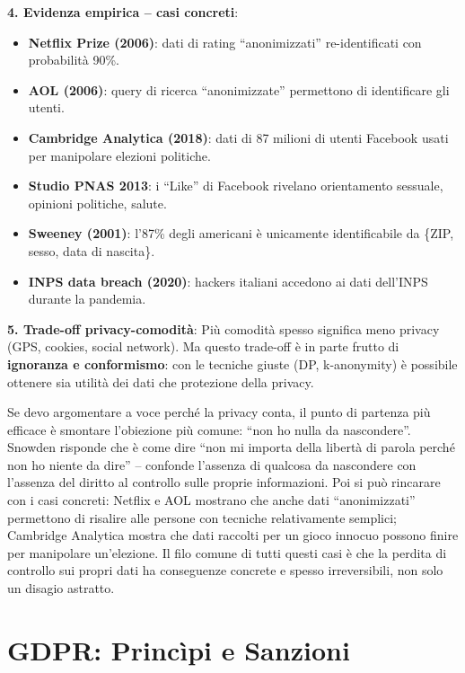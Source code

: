 \documentclass[a4paper,11pt]{article}
\begin{document}
\textbf{4. Evidenza empirica -- casi concreti}:
\begin{itemize}
  \item \textbf{Netflix Prize (2006)}: dati di rating ``anonimizzati'' re-identificati con probabilit\`{a} 90\%.
  \item \textbf{AOL (2006)}: query di ricerca ``anonimizzate'' permettono di identificare gli utenti.
  \item \textbf{Cambridge Analytica (2018)}: dati di 87 milioni di utenti Facebook usati per manipolare elezioni politiche.
  \item \textbf{Studio PNAS 2013}: i ``Like'' di Facebook rivelano orientamento sessuale, opinioni politiche, salute.
  \item \textbf{Sweeney (2001)}: l'87\% degli americani \`{e} unicamente identificabile da \{ZIP, sesso, data di nascita\}.
  \item \textbf{INPS data breach (2020)}: hackers italiani accedono ai dati dell'INPS durante la pandemia.
\end{itemize}

\textbf{5. Trade-off privacy-comodit\`{a}}: Pi\`{u} comodit\`{a} spesso significa meno privacy (GPS, cookies, social network). Ma questo trade-off \`{e} in parte frutto di \textbf{ignoranza e conformismo}: con le tecniche giuste (DP, k-anonymity) \`{e} possibile ottenere sia utilit\`{a} dei dati che protezione della privacy.

\begin{nota}
Se devo argomentare a voce perch\'{e} la privacy conta, il punto di partenza pi\`{u} efficace \`{e} smontare l'obiezione pi\`{u} comune: ``non ho nulla da nascondere''. Snowden risponde che \`{e} come dire ``non mi importa della libert\`{a} di parola perch\'{e} non ho niente da dire'' -- confonde l'assenza di qualcosa da nascondere con l'assenza del diritto al controllo sulle proprie informazioni. Poi si pu\`{o} rincarare con i casi concreti: Netflix e AOL mostrano che anche dati ``anonimizzati'' permettono di risalire alle persone con tecniche relativamente semplici; Cambridge Analytica mostra che dati raccolti per un gioco innocuo possono finire per manipolare un'elezione. Il filo comune di tutti questi casi \`{e} che la perdita di controllo sui propri dati ha conseguenze concrete e spesso irreversibili, non solo un disagio astratto.
\end{nota}

\section{GDPR: Princìpi e Sanzioni}
\end{document}
